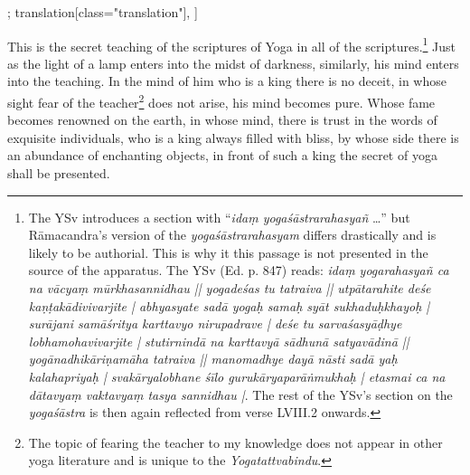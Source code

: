 \begin{alignment}[
  texts=edition[class="edition"];
  translation[class="translation"],
  ]
\begin{translation}
\begin{tlate}[p57_04]
\end{tlate}
\begin{tlate}[p58_01]
\label{secretofscriptures}
This is the secret teaching of the scriptures of Yoga in all of the scriptures.\footnote{The YSv introduces a section with ``\textit{idaṃ yogaśāstrarahasyañ} \ldots'' but Rāmacandra's version of the \textit{yogaśāstrarahasyam} differs drastically and is likely to be authorial. This is why it this passage is not presented in the source of the apparatus. The YSv (Ed. p. 847) reads: \textit{idaṃ yogarahasyañ ca na vācyaṃ mūrkhasannidhau || yogadeśas tu tatraiva || utpātarahite deśe kaṇṭakādivivarjite | abhyasyate sadā yogaḥ samaḥ syāt sukhaduḥkhayoḥ | surājani samāśritya karttavyo nirupadrave | deśe tu sarvaśasyāḍhye lobhamohavivarjite | stutirnindā na karttavyā sādhunā satyavādinā || yogānadhikāriṇamāha tatraiva || manomadhye dayā nāsti sadā yaḥ kalahapriyaḥ | svakāryalobhane śīlo gurukāryaparāṅmukhaḥ | etasmai ca na dātavyaṃ vaktavyaṃ tasya sannidhau |}. The rest of the YSv's section on the \textit{yogaśāstra} is then again reflected from verse LVIII.2 onwards.} Just as the light of a lamp enters into the midst of darkness, similarly, his mind enters into the teaching.
In the mind of him who is a king there is no deceit, in whose sight fear of the teacher\footnote{The topic of fearing the teacher to my knowledge does not appear in other yoga literature and is unique to the \textit{Yogatattvabindu}.} does not arise, his mind becomes pure. 
Whose fame becomes renowned on the earth, in whose mind, there is trust in the words of exquisite individuals, who is a king always filled with bliss, by whose side there is an abundance of enchanting objects, in front of such a king the secret of yoga shall be presented. 
    \end{tlate}
  \end{translation}
\end{alignment}
\pagebreak %
